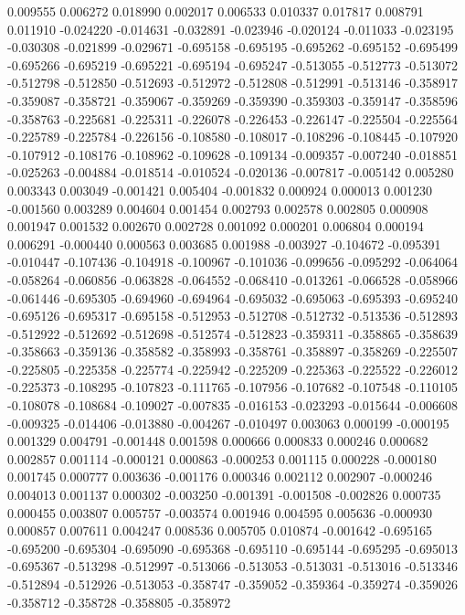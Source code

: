 0.009555
0.006272
0.018990
0.002017
0.006533
0.010337
0.017817
0.008791
0.011910
-0.024220
-0.014631
-0.032891
-0.023946
-0.020124
-0.011033
-0.023195
-0.030308
-0.021899
-0.029671
-0.695158
-0.695195
-0.695262
-0.695152
-0.695499
-0.695266
-0.695219
-0.695221
-0.695194
-0.695247
-0.513055
-0.512773
-0.513072
-0.512798
-0.512850
-0.512693
-0.512972
-0.512808
-0.512991
-0.513146
-0.358917
-0.359087
-0.358721
-0.359067
-0.359269
-0.359390
-0.359303
-0.359147
-0.358596
-0.358763
-0.225681
-0.225311
-0.226078
-0.226453
-0.226147
-0.225504
-0.225564
-0.225789
-0.225784
-0.226156
-0.108580
-0.108017
-0.108296
-0.108445
-0.107920
-0.107912
-0.108176
-0.108962
-0.109628
-0.109134
-0.009357
-0.007240
-0.018851
-0.025263
-0.004884
-0.018514
-0.010524
-0.020136
-0.007817
-0.005142
0.005280
0.003343
0.003049
-0.001421
0.005404
-0.001832
0.000924
0.000013
0.001230
-0.001560
0.003289
0.004604
0.001454
0.002793
0.002578
0.002805
0.000908
0.001947
0.001532
0.002670
0.002728
0.001092
0.000201
0.006804
0.000194
0.006291
-0.000440
0.000563
0.003685
0.001988
-0.003927
-0.104672
-0.095391
-0.010447
-0.107436
-0.104918
-0.100967
-0.101036
-0.099656
-0.095292
-0.064064
-0.058264
-0.060856
-0.063828
-0.064552
-0.068410
-0.013261
-0.066528
-0.058966
-0.061446
-0.695305
-0.694960
-0.694964
-0.695032
-0.695063
-0.695393
-0.695240
-0.695126
-0.695317
-0.695158
-0.512953
-0.512708
-0.512732
-0.513536
-0.512893
-0.512922
-0.512692
-0.512698
-0.512574
-0.512823
-0.359311
-0.358865
-0.358639
-0.358663
-0.359136
-0.358582
-0.358993
-0.358761
-0.358897
-0.358269
-0.225507
-0.225805
-0.225358
-0.225774
-0.225942
-0.225209
-0.225363
-0.225522
-0.226012
-0.225373
-0.108295
-0.107823
-0.111765
-0.107956
-0.107682
-0.107548
-0.110105
-0.108078
-0.108684
-0.109027
-0.007835
-0.016153
-0.023293
-0.015644
-0.006608
-0.009325
-0.014406
-0.013880
-0.004267
-0.010497
0.003063
0.000199
-0.000195
0.001329
0.004791
-0.001448
0.001598
0.000666
0.000833
0.000246
0.000682
0.002857
0.001114
-0.000121
0.000863
-0.000253
0.001115
0.000228
-0.000180
0.001745
0.000777
0.003636
-0.001176
0.000346
0.002112
0.002907
-0.000246
0.004013
0.001137
0.000302
-0.003250
-0.001391
-0.001508
-0.002826
0.000735
0.000455
0.003807
0.005757
-0.003574
0.001946
0.004595
0.005636
-0.000930
0.000857
0.007611
0.004247
0.008536
0.005705
0.010874
-0.001642
-0.695165
-0.695200
-0.695304
-0.695090
-0.695368
-0.695110
-0.695144
-0.695295
-0.695013
-0.695367
-0.513298
-0.512997
-0.513066
-0.513053
-0.513031
-0.513016
-0.513346
-0.512894
-0.512926
-0.513053
-0.358747
-0.359052
-0.359364
-0.359274
-0.359026
-0.358712
-0.358728
-0.358805
-0.358972
